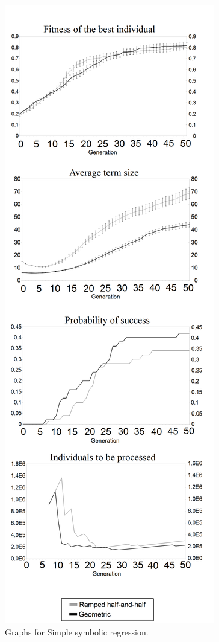 \documentclass[conference]{IEEEtran}
\begin{document}
\begin{figure}[h!]
  \centering
  \caption{Graphs for Simple symbolic regression.}
  \includegraphics[scale=0.241]{imgs/cec/SSRb.PNG}
\end{figure}
\end{document}
